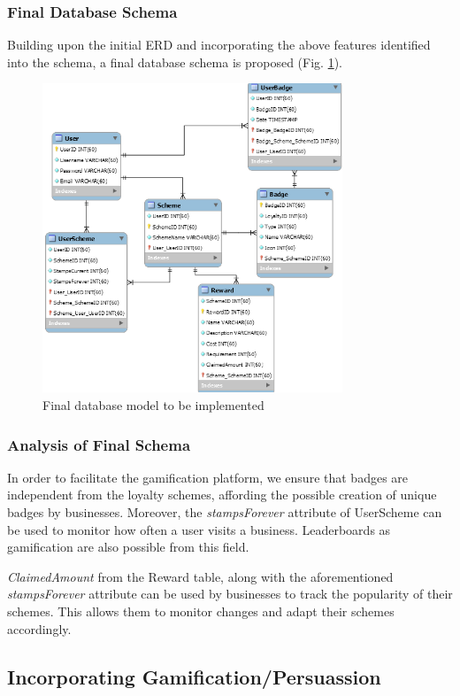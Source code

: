 \subsubsection{Final Database Schema}
Building upon the initial ERD and incorporating the above features identified into the schema, a final database schema is proposed  (Fig. \ref{fig:finaldb}). 
\label{sec:dbSchema}
\begin{figure}[H]
  \centering
    \includegraphics[width=0.8\textwidth]{img/architecture.png}
      \caption{Final database model to be implemented}
      \label{fig:finaldb}
\end{figure}

\subsubsection{Analysis of Final Schema}
In order to facilitate the gamification platform, we ensure that badges are independent from the loyalty schemes, affording the possible creation of unique badges by businesses. Moreover, the \emph{stampsForever} attribute of UserScheme can be used to monitor how often a user visits a business. Leaderboards as gamification are also possible from this field.

\emph{ClaimedAmount} from the Reward table, along with the aforementioned \emph{stampsForever} attribute can be used by businesses to track the popularity of their schemes. This allows them to monitor changes and adapt their schemes accordingly.

\newpage
\subsection{Incorporating Gamification/Persuassion}
